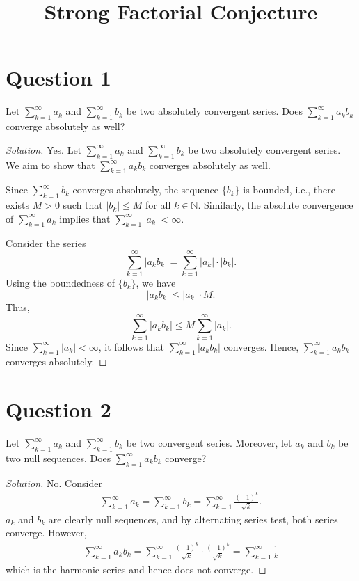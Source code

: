 \documentclass[a4paper]{article}
\title{Strong Factorial Conjecture}
\theoremstyle{definition}
\begin{document}
\section{Question 1}
Let \(\sum_{k=1}^\infty a_k\) and \(\sum_{k=1}^\infty b_k\) be two absolutely convergent series. Does \(\sum_{k=1}^{\infty} a_k b_k\) converge absolutely as well?
\begin{proof}[Solution]
    Yes. Let \(\sum_{k=1}^\infty a_k\) and \(\sum_{k=1}^\infty b_k\) be two absolutely convergent series. We aim to show that \(\sum_{k=1}^\infty a_k b_k\) converges absolutely as well.
    
    Since \(\sum_{k=1}^\infty b_k\) converges absolutely, the sequence \(\{b_k\}\) is bounded, i.e., there exists \(M > 0\) such that \(|b_k| \leq M\) for all \(k \in \mathbb{N}\). Similarly, the absolute convergence of \(\sum_{k=1}^\infty a_k\) implies that \(\sum_{k=1}^\infty |a_k| < \infty\).
    
    Consider the series
    \[
    \sum_{k=1}^\infty |a_k b_k| = \sum_{k=1}^\infty |a_k| \cdot |b_k|.
    \]
    Using the boundedness of \(\{b_k\}\), we have
    \[
    |a_k b_k| \leq |a_k| \cdot M.
    \]
    Thus,
    \[
    \sum_{k=1}^\infty |a_k b_k| \leq M \sum_{k=1}^\infty |a_k|.
    \]
    Since \(\sum_{k=1}^\infty |a_k| < \infty\), it follows that \(\sum_{k=1}^\infty |a_k b_k|\) converges. Hence, \(\sum_{k=1}^\infty a_k b_k\) converges absolutely.
    \end{proof}
\section{Question 2}
Let \(\sum_{k=1}^\infty a_k\) and \(\sum_{k=1}^\infty b_k\) be two convergent series. Moreover, let \(a_k\) and \(b_k\) be two null sequences. Does \(\sum_{k=1}^\infty a_k b_k\) converge?
\begin{proof}[Solution]
    No. Consider
    \begin{align*}
        \sum_{k=1}^{\infty} a_k = \sum_{k=1}^{\infty} b_k = \sum_{k=1}^{\infty} \frac{(-1)^k}{\sqrt{k}} \text{.}
    \end{align*}
    \(a_k\) and \(b_k\) are clearly null sequences, and by alternating series test, both series converge. However,
    \begin{align*}
        \sum_{k=1}^\infty a_k b_k = \sum_{k=1}^\infty \frac{(-1)^k}{\sqrt{k}} \cdot  \frac{(-1)^k}{\sqrt{k}} = \sum_{k=1}^\infty \frac{1}{k}
    \end{align*}
    which is the harmonic series and hence does not converge.
\end{proof}
\end{document}

